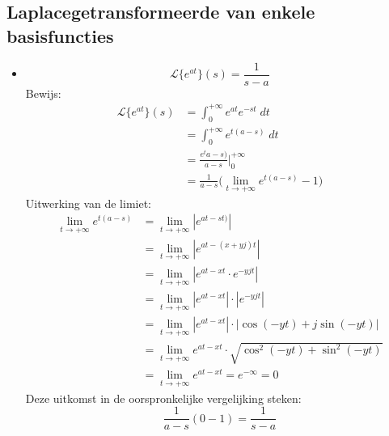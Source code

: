 \documentclass[12pt]{report}
\begin{document}
\subsection{Laplacegetransformeerde van enkele basisfuncties}
\begin{itemize}
\item $$\mathcal{L}\{e^{at}\}(s) = \frac{1}{s - a}$$
Bewijs:
\begin{equation*}
\begin{split}
\mathcal{L}\{e^{at}\}(s) & = \int_{0}^{+\infty}e^{at}e^{-st} \; dt \\
                            & = \int_{0}^{+\infty} e^{t(a - s)} \; dt \\
                            & = \frac{e^t{a - s)}}{a - s}\bigg|_{0}^{+\infty} \\
                            & = \frac{1}{a - s}\bigg(\lim_{t \to +\infty}e^{t(a - s)} - 1\bigg)                         
\end{split}
\end{equation*}
Uitwerking van de limiet:
\begin{equation*}
\begin{split}
    \lim_{t \to +\infty}e^{t(a - s)} & = \lim_{t \to +\infty}|e^{at - st)} | \\
                                    & = \lim_{t \to +\infty}|e^{at - (x + yj)t}| \\
                                    & = \lim_{t \to +\infty}|e^{at - xt}\cdot e^{-yjt}| \\
                                    & = \lim_{t \to +\infty}|e^{at - xt}|\cdot |e^{-yjt}| \\
                                    & = \lim_{t \to +\infty}|e^{at - xt}|\cdot |\cos(-yt) + j\sin(-yt)| \\
                                    & = \lim_{t \to +\infty}e^{at - xt}\cdot \sqrt{\cos^2(-yt) + \sin^2(-yt)} \\
                                    & = \lim_{t \to +\infty}e^{at - xt} = e^{-\infty} = 0
\end{split}
\end{equation*}
Deze uitkomst in de oorspronkelijke vergelijking steken:
$$\frac{1}{a - s}(0 - 1) = \frac{1}{s - a}$$ 


\end{itemize}
\end{document}

